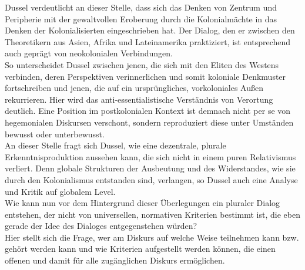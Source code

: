 \noindent Dussel verdeutlicht an dieser Stelle, dass sich das Denken von Zentrum und
Peripherie mit der gewaltvollen Eroberung durch die Kolonialmächte in das Denken
der Kolonialisierten eingeschrieben hat. Der Dialog, den er zwischen den
Theoretikern aus Asien, Afrika und Lateinamerika praktiziert, ist entsprechend
auch geprägt von neokolonialen Verbindungen. \\
So unterscheidet Dussel zwischen
jenen, die sich mit den Eliten des Westens verbinden, deren Perspektiven
verinnerlichen und somit koloniale Denkmuster fortschreiben und jenen, die auf
ein ursprüngliches, vorkoloniales Außen rekurrieren. Hier wird das
anti-essentialistische Verständnis von Verortung deutlich. Eine Position im
postkolonialen Kontext\footnotemark {} ist demnach nicht per se von hegemonialen Diskursen
verschont, sondern reproduziert diese unter Umständen bewusst oder unterbewusst.\\

\noindent An dieser Stelle fragt sich Dussel, wie eine dezentrale, plurale
Erkenntnisproduktion aussehen kann, die sich nicht in einem puren Relativismus
verliert. Denn globale Strukturen der Ausbeutung und des Widerstandes, wie sie
durch den Kolonialismus entstanden sind, verlangen, so Dussel auch eine Analyse
und Kritik auf globalem Level. \\
Wie kann nun vor dem Hintergrund dieser
Überlegungen ein pluraler Dialog entstehen, der nicht von universellen,
normativen Kriterien bestimmt ist, die eben gerade der Idee des Dialoges
entgegenstehen würden?\\
Hier stellt sich die Frage, wer am Diskurs auf welche Weise teilnehmen kann bzw.
gehört werden kann und wie Kriterien aufgestellt werden können, die einen
offenen und damit für alle zugänglichen Diskurs ermöglichen.\\

